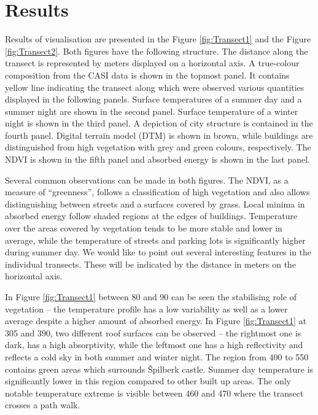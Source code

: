 \section{Results}

Results of visualisation are presented in the Figure \ref{fig:Transect1} and the Figure \ref{fig:Transect2}. Both figures have the following structure. The distance along the transect is represented by meters displayed on a horizontal axis. A true-colour composition from the CASI data is shown in the topmost panel. It contains yellow line indicating the transect along which were observed various quantities displayed in the following panels. Surface temperatures of a summer day and a summer night are shown in the second panel. Surface temperature of a winter night is shown in the third panel. A depiction of city structure is contained in the fourth panel. Digital terrain model (DTM) is shown in brown, while buildings are distinguished from high vegetation with grey and green colours, respectively. The NDVI is shown in the fifth panel and absorbed energy is shown in the last panel.

Several common observations can be made in both figures. The NDVI, as a measure of ``greenness'', follows a classification of high vegetation and also allows distinguishing between streets and a surfaces covered by grass. Local minima in absorbed energy follow shaded regions at the edges of buildings. Temperature over the areas covered by vegetation tends to be more stable and lower in average, while the temperature of streets and parking lots is significantly higher during summer day. We would like to point out several interesting features in the individual transects. These will be indicated by the distance in meters on the horizontal axis.

In Figure \ref{fig:Transect1} between 80 and 90 can be seen the stabilising role of vegetation – the temperature profile has a low variability as well as a lower average despite a higher amount of absorbed energy. In Figure \ref{fig:Transect1} at 305 and 390, two different roof surfaces can be observed – the rightmost one is dark, has a high absorptivity, while the leftmost one has a high reflectivity and reflects a cold sky in both summer and winter night. The region from 400 to 550 contains green areas which surrounds Špilberk castle. Summer day temperature is significantly lower in this region compared to other built up areas. The only notable temperature extreme is visible between 460 and 470 where the transect crosses a path walk.

